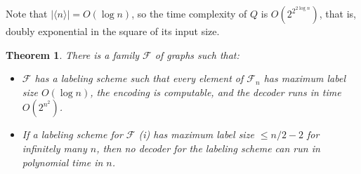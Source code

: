 \documentclass{article}
\newtheorem{theorem}{Theorem}
\newcommand{\bincode}[1]{\ensuremath{\langle #1 \rangle}}
\begin{document}
Note that $\vert \bincode{n} \vert = O(\log n)$, so the time complexity of $Q$ is
$O\left( 2^{2^{2 \log n}}\right)$, that is, doubly exponential in the square of its input size.

\begin{theorem}\label{the:longertimeshorterlabels}
There is a family $\mathcal{F}$ of graphs such that:

\begin{itemize}

\item $\mathcal{F}$ has a labeling scheme such that
every element of $\mathcal{F}_n$ has maximum label size $O(\log n)$,
the encoding is computable, and the decoder runs in time $O(2^{n^2})$.

\item If a labeling scheme for $\mathcal{F}$ (i) has maximum label size $\leq n/2 - 2$ for infinitely many $n$,
then no decoder for the labeling scheme can run in polynomial time in $n$.

\end{itemize}
\end{theorem}
\end{document}
